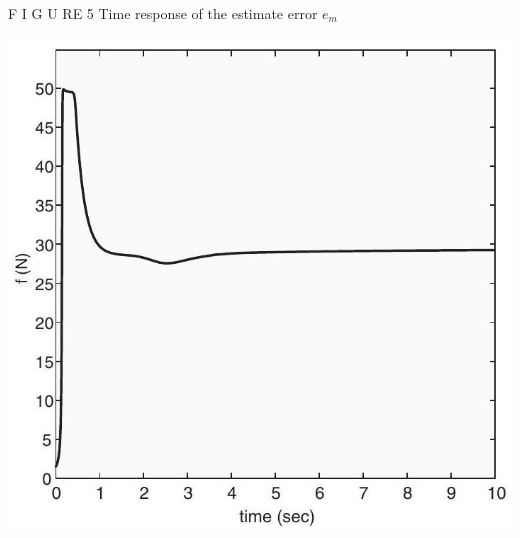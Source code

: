 \documentclass[10pt]{article}
\begin{document}
F I G U RE 5 Time response of the estimate error $e_{m}$

\begin{center}
\includegraphics[max width=\textwidth]{2023_10_07_eefdf58cc80a47c1244eg-11(2)}
\end{center}
\end{document}
